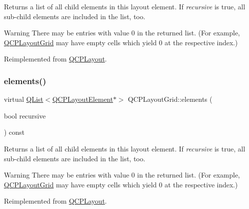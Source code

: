 Returns a list of all child elements in this layout element. If {\itshape recursive} is true, all sub-\/child elements are included in the list, too.

\begin{DoxyWarning}{Warning}
There may be entries with value 0 in the returned list. (For example, \hyperlink{class_q_c_p_layout_grid}{Q\+C\+P\+Layout\+Grid} may have empty cells which yield 0 at the respective index.) 
\end{DoxyWarning}


Reimplemented from \hyperlink{class_q_c_p_layout_aca129722c019f91d3367046f80abfa77}{Q\+C\+P\+Layout}.

\mbox{\label{class_q_c_p_layout_grid_adc2b77187862688f52796d208bd9756c}} 
\subsubsection{\texorpdfstring{elements()}{elements()}\hspace{0.1cm}{\footnotesize\ttfamily [2/2]}}
{\footnotesize\ttfamily virtual \hyperlink{class_q_list}{Q\+List}$<$\hyperlink{class_q_c_p_layout_element}{Q\+C\+P\+Layout\+Element}$\ast$$>$ Q\+C\+P\+Layout\+Grid\+::elements (\begin{DoxyParamCaption}\item[{bool}]{recursive }\end{DoxyParamCaption}) const\hspace{0.3cm}{\ttfamily [virtual]}}

Returns a list of all child elements in this layout element. If {\itshape recursive} is true, all sub-\/child elements are included in the list, too.

\begin{DoxyWarning}{Warning}
There may be entries with value 0 in the returned list. (For example, \hyperlink{class_q_c_p_layout_grid}{Q\+C\+P\+Layout\+Grid} may have empty cells which yield 0 at the respective index.) 
\end{DoxyWarning}


Reimplemented from \hyperlink{class_q_c_p_layout_aca129722c019f91d3367046f80abfa77}{Q\+C\+P\+Layout}.

\mbox{\label{class_q_c_p_layout_grid_a886c0dcbabd51a45da399e044552b685}} 
